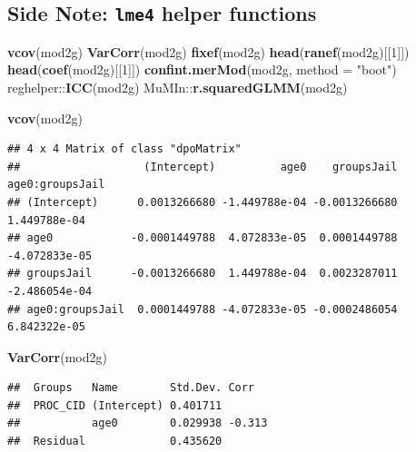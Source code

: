\documentclass[]{article}
\newenvironment{Shaded}{\begin{snugshade}}{\end{snugshade}}
\newcommand{\KeywordTok}[1]{\textcolor[rgb]{0.13,0.29,0.53}{\textbf{{#1}}}}
\newcommand{\DataTypeTok}[1]{\textcolor[rgb]{0.13,0.29,0.53}{{#1}}}
\newcommand{\DecValTok}[1]{\textcolor[rgb]{0.00,0.00,0.81}{{#1}}}
\newcommand{\StringTok}[1]{\textcolor[rgb]{0.31,0.60,0.02}{{#1}}}
\newcommand{\NormalTok}[1]{{#1}}
\begin{document}
\subsection{\texorpdfstring{Side Note: \texttt{lme4} helper
functions}{Side Note: lme4 helper functions}}\label{side-note-lme4-helper-functions}

\begin{Shaded}
\begin{Highlighting}[]
\KeywordTok{vcov}\NormalTok{(mod2g)}
\KeywordTok{VarCorr}\NormalTok{(mod2g)}
\KeywordTok{fixef}\NormalTok{(mod2g)}
\KeywordTok{head}\NormalTok{(}\KeywordTok{ranef}\NormalTok{(mod2g)[[}\DecValTok{1}\NormalTok{]])}
\KeywordTok{head}\NormalTok{(}\KeywordTok{coef}\NormalTok{(mod2g)[[}\DecValTok{1}\NormalTok{]])}
\KeywordTok{confint.merMod}\NormalTok{(mod2g, }\DataTypeTok{method =} \StringTok{"boot"}\NormalTok{)}
\NormalTok{reghelper::}\KeywordTok{ICC}\NormalTok{(mod2g)}
\NormalTok{MuMIn::}\KeywordTok{r.squaredGLMM}\NormalTok{(mod2g)}
\end{Highlighting}
\end{Shaded}

\small

\begin{Shaded}
\begin{Highlighting}[]
\KeywordTok{vcov}\NormalTok{(mod2g)}
\end{Highlighting}
\end{Shaded}

\begin{verbatim}
## 4 x 4 Matrix of class "dpoMatrix"
##                   (Intercept)          age0    groupsJail age0:groupsJail
## (Intercept)      0.0013266680 -1.449788e-04 -0.0013266680    1.449788e-04
## age0            -0.0001449788  4.072833e-05  0.0001449788   -4.072833e-05
## groupsJail      -0.0013266680  1.449788e-04  0.0023287011   -2.486054e-04
## age0:groupsJail  0.0001449788 -4.072833e-05 -0.0002486054    6.842322e-05
\end{verbatim}

\small

\begin{Shaded}
\begin{Highlighting}[]
\KeywordTok{VarCorr}\NormalTok{(mod2g)}
\end{Highlighting}
\end{Shaded}

\begin{verbatim}
##  Groups   Name        Std.Dev. Corr  
##  PROC_CID (Intercept) 0.401711       
##           age0        0.029938 -0.313
##  Residual             0.435620
\end{verbatim}
\end{document}
